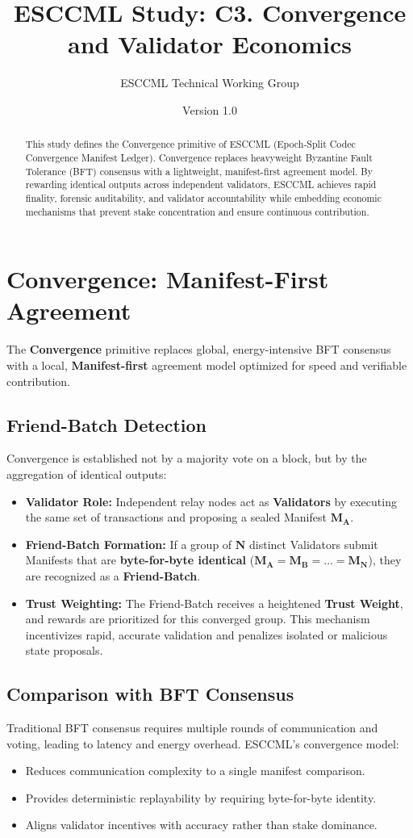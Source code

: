 \documentclass[11pt, a4paper]{article}
\title{\textbf{ESCCML Study: C3. Convergence and Validator Economics}}
\author{ESCCML Technical Working Group}
\date{Version 1.0}
\begin{document}
\maketitle

\begin{abstract}
This study defines the Convergence primitive of ESCCML (Epoch-Split Codec Convergence Manifest Ledger).
Convergence replaces heavyweight Byzantine Fault Tolerance (BFT) consensus with a lightweight,
manifest-first agreement model. By rewarding identical outputs across independent validators,
ESCCML achieves rapid finality, forensic auditability, and validator accountability while embedding
economic mechanisms that prevent stake concentration and ensure continuous contribution.
\end{abstract}

\section{Convergence: Manifest-First Agreement}
The \textbf{Convergence} primitive replaces global, energy-intensive BFT consensus with a local,
\textbf{Manifest-first} agreement model optimized for speed and verifiable contribution.

\subsection{Friend-Batch Detection}
Convergence is established not by a majority vote on a block, but by the aggregation of identical outputs:
\begin{itemize}
    \item \textbf{Validator Role:} Independent relay nodes act as \textbf{Validators} by executing the same set of transactions and proposing a sealed Manifest $\mathbf{M_A}$.
    \item \textbf{Friend-Batch Formation:} If a group of $\mathbf{N}$ distinct Validators submit Manifests that are \textbf{byte-for-byte identical} ($\mathbf{M_A = M_B = \dots = M_N}$), they are recognized as a \textbf{Friend-Batch}.
    \item \textbf{Trust Weighting:} The Friend-Batch receives a heightened \textbf{Trust Weight}, and rewards are prioritized for this converged group. This mechanism incentivizes rapid, accurate validation and penalizes isolated or malicious state proposals.
\end{itemize}

\subsection{Comparison with BFT Consensus}
Traditional BFT consensus requires multiple rounds of communication and voting, leading to
latency and energy overhead. ESCCML’s convergence model:
\begin{itemize}
    \item Reduces communication complexity to a single manifest comparison.
    \item Provides deterministic replayability by requiring byte-for-byte identity.
    \item Aligns validator incentives with accuracy rather than stake dominance.
\end{itemize}
\end{document}
